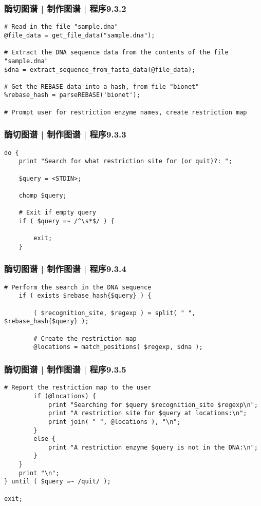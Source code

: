 \begin{frame}[fragile]
  \frametitle{酶切图谱 | 制作图谱 | 程序9.3.2}
\begin{lstlisting}[firstnumber=17]
# Read in the file "sample.dna"
@file_data = get_file_data("sample.dna");

# Extract the DNA sequence data from the contents of the file "sample.dna"
$dna = extract_sequence_from_fasta_data(@file_data);

# Get the REBASE data into a hash, from file "bionet"
%rebase_hash = parseREBASE('bionet');

# Prompt user for restriction enzyme names, create restriction map
\end{lstlisting}
\end{frame}

\begin{frame}[fragile]
  \frametitle{酶切图谱 | 制作图谱 | 程序9.3.3}
\begin{lstlisting}[firstnumber=27]
do {
    print "Search for what restriction site for (or quit)?: ";

    $query = <STDIN>;

    chomp $query;

    # Exit if empty query
    if ( $query =~ /^\s*$/ ) {

        exit;
    }
\end{lstlisting}
\end{frame}

\begin{frame}[fragile]
  \frametitle{酶切图谱 | 制作图谱 | 程序9.3.4}
\begin{lstlisting}[firstnumber=40]
    # Perform the search in the DNA sequence
    if ( exists $rebase_hash{$query} ) {

        ( $recognition_site, $regexp ) = split( " ", $rebase_hash{$query} );

        # Create the restriction map
        @locations = match_positions( $regexp, $dna );
\end{lstlisting}
\end{frame}

\begin{frame}[fragile]
  \frametitle{酶切图谱 | 制作图谱 | 程序9.3.5}
\begin{lstlisting}[firstnumber=48,basicstyle=\small\tt,numberstyle=\footnotesize]
        # Report the restriction map to the user
        if (@locations) {
            print "Searching for $query $recognition_site $regexp\n";
            print "A restriction site for $query at locations:\n";
            print join( " ", @locations ), "\n";
        }
        else {
            print "A restriction enzyme $query is not in the DNA:\n";
        }
    }
    print "\n";
} until ( $query =~ /quit/ );

exit;
\end{lstlisting}
\end{frame}

